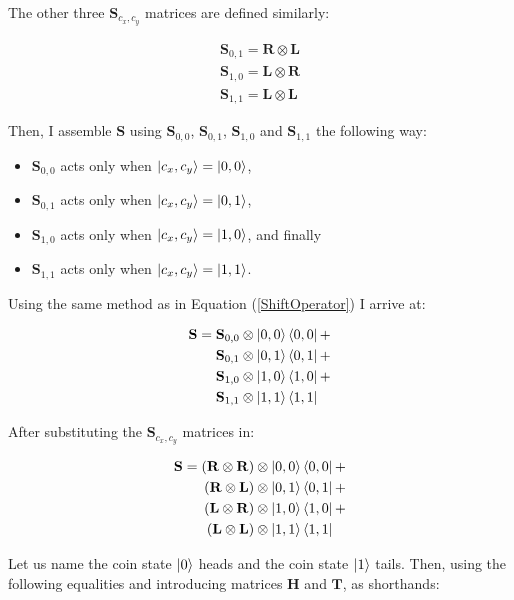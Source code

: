The other three $\mathbf{S}_{c_x,c_y}$ matrices are defined similarly: 

\begin{align*}
    \mathbf{S}_{0,1} =  \mathbf{R} \otimes \mathbf{L}\\
    \mathbf{S}_{1,0} =  \mathbf{L} \otimes \mathbf{R}\\
    \mathbf{S}_{1,1} =  \mathbf{L} \otimes \mathbf{L}
\end{align*}

Then, I assemble $\mathbf{S}$ using $\mathbf{S}_{0,0}$, $\mathbf{S}_{0,1}$, $\mathbf{S}_{1,0}$ and $\mathbf{S}_{1,1}$ the following way:
\begin{itemize}
\item $\mathbf{S}_{0,0}$ acts only when $\ket{c_x,c_y} = \ket{0,0}$,
\item $\mathbf{S}_{0,1}$ acts only when $\ket{c_x,c_y} = \ket{0,1}$,
\item $\mathbf{S}_{1,0}$ acts only when $\ket{c_x,c_y} = \ket{1,0}$, and finally
\item $\mathbf{S}_{1,1}$ acts only when $\ket{c_x,c_y} = \ket{1,1}$.
\end{itemize}

Using the same method as in Equation (\ref{ShiftOperator}) I arrive at:

\begin{align*}
    \mathbf{S} =
    \mathbf{S}_{0,0} \otimes \ket{0,0}\bra{0,0} + \\
    \mathbf{S}_{0,1} \otimes \ket{0,1}\bra{0,1} + \\
    \mathbf{S}_{1,0} \otimes \ket{1,0}\bra{1,0} + \\
    \mathbf{S}_{1,1} \otimes \ket{1,1}\bra{1,1}\phantom{+}
\end{align*}

After substituting the $\mathbf{S}_{c_x,c_y}$ matrices in:

\begin{align*} 
    \mathbf{S} =   
    (\mathbf{R} \otimes \mathbf{R}) \otimes \ket{0,0}\bra{0,0} + \\
    (\mathbf{R} \otimes \mathbf{L}) \otimes \ket{0,1}\bra{0,1} + \\
    (\mathbf{L} \otimes \mathbf{R}) \otimes \ket{1,0}\bra{1,0} + \\
    (\mathbf{L} \otimes \mathbf{L}) \otimes \ket{1,1}\bra{1,1}\phantom{+}
\end{align*}

Let us name the coin state $\ket{0}$ heads and the coin state $\ket{1}$ tails. Then, using the following equalities and introducing matrices $\mathbf{H}$ and $\mathbf{T}$, as shorthands:

